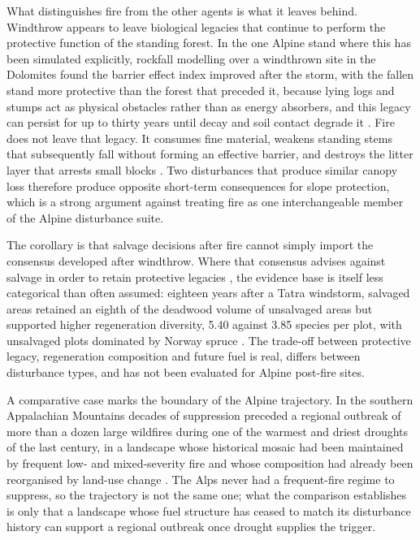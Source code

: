 \documentclass[11pt,a4paper]{article}
\begin{document}
What distinguishes fire from the other agents is what it leaves behind. Windthrow appears to leave biological legacies that continue to perform the protective function of the standing forest. In the one Alpine stand where this has been simulated explicitly, rockfall modelling over a windthrown site in the Dolomites found the barrier effect index improved after the storm, with the fallen stand more protective than the forest that preceded it, because lying logs and stumps act as physical obstacles rather than as energy absorbers, and this legacy can persist for up to thirty years until decay and soil contact degrade it \citep{costa_biological_2021}. Fire does not leave that legacy. It consumes fine material, weakens standing stems that subsequently fall without forming an effective barrier, and destroys the litter layer that arrests small blocks \citep{asteriou_assessing_2025}. Two disturbances that produce similar canopy loss therefore produce opposite short-term consequences for slope protection, which is a strong argument against treating fire as one interchangeable member of the Alpine disturbance suite.

The corollary is that salvage decisions after fire cannot simply import the consensus developed after windthrow. Where that consensus advises against salvage in order to retain protective legacies \citep{costa_biological_2021}, the evidence base is itself less categorical than often assumed: eighteen years after a Tatra windstorm, salvaged areas retained an eighth of the deadwood volume of unsalvaged areas but supported higher regeneration diversity, 5.40 against 3.85 species per plot, with unsalvaged plots dominated by Norway spruce \citep{seben_impact_2024}. The trade-off between protective legacy, regeneration composition and future fuel is real, differs between disturbance types, and has not been evaluated for Alpine post-fire sites.

A comparative case marks the boundary of the Alpine trajectory. In the southern Appalachian Mountains decades of suppression preceded a regional outbreak of more than a dozen large wildfires during one of the warmest and driest droughts of the last century, in a landscape whose historical mosaic had been maintained by frequent low- and mixed-severity fire and whose composition had already been reorganised by land-use change \citep{reilly_drivers_2022}. The Alps never had a frequent-fire regime to suppress, so the trajectory is not the same one; what the comparison establishes is only that a landscape whose fuel structure has ceased to match its disturbance history can support a regional outbreak once drought supplies the trigger.
\end{document}

